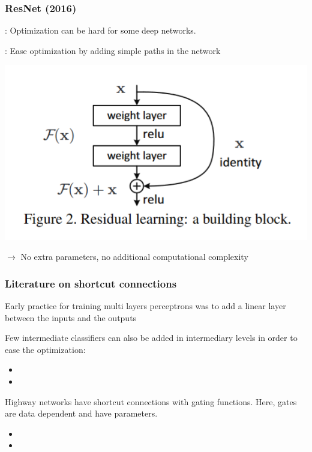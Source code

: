 \begin{frame}
	\frametitle{ResNet (2016)}
	
		
	\bigskip 	
		
	: Optimization can be hard for some deep networks.
	
	\bigskip 
	
	: Ease optimization by adding simple paths in the network
	
	\bigskip 
	
	\begin{center}
		\includegraphics[scale=0.7]{figs/ResNet_IdentityBlock}
	\end{center}
	
	\medskip 
	$\rightarrow$ No extra parameters, no additional computational complexity
\end{frame}

\begin{frame}
	\frametitle{Literature on shortcut connections}
	
	Early practice for training multi layers perceptrons was to add a linear layer between the inputs and the outputs
	
	
	\bigskip 
	
	Few intermediate classifiers can also be added in intermediary levels in order to ease the optimization: 
	\begin{itemize}
		\item 	{}
		\item 	{}
	\end{itemize}

	\bigskip 

	Highway networks have shortcut connections with gating functions.
	Here, gates are data dependent and have parameters. 
	
	\begin{itemize}
		\item {}
		\item {}
	\end{itemize}

\end{frame}

